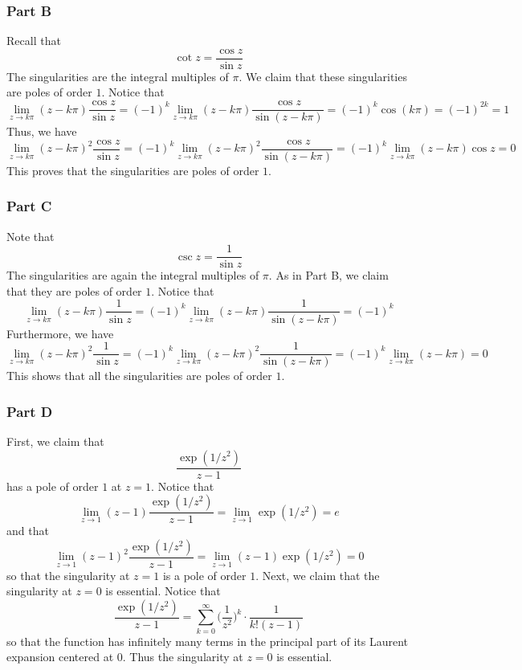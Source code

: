 \documentclass[12pt]{article}
\begin{document}
\subsubsection*{Part B}
Recall that 
\[
\cot z = \frac{\cos z}{\sin z}
\] The singularities are the integral multiples of $\pi$. We claim that these singularities are poles of order $1$. Notice that 
\[
\lim_{z\rightarrow k \pi} (z-k \pi) \frac{\cos z}{\sin z} = (-1)^k \lim_{z\rightarrow k \pi} (z-k \pi) \frac{\cos z}{\sin (z - k \pi)} = (-1)^k \cos(k\pi) = (-1)^{2k} = 1
\] Thus, we have
\[
\lim_{z\rightarrow k \pi} (z-k \pi)^2 \frac{\cos z}{\sin z} = (-1)^k \lim_{z\rightarrow k \pi} (z-k \pi)^2 \frac{\cos z}{\sin (z - k \pi)} = (-1)^k \lim_{z\rightarrow k \pi} (z-k \pi) \cos z = 0
\] This proves that the singularities are poles of order $1$.
\subsubsection*{Part C}
Note that
\[
\csc z = \frac{1}{\sin z}
\] The singularities are again the integral multiples of $\pi$. As in Part B, we claim that they are poles of order $1$. Notice that
\[
\lim_{z\rightarrow k\pi} (z- k\pi) \frac{1}{\sin z} = (-1)^k \lim_{z\rightarrow k \pi} (z-k \pi) \frac{1}{\sin (z - k \pi)} = (-1)^k
\] Furthermore, we have
\[
\lim_{z\rightarrow k\pi} (z- k\pi)^2 \frac{1}{\sin z} = (-1)^k \lim_{z\rightarrow k \pi} (z-k \pi)^2 \frac{1}{\sin (z - k \pi)} = (-1)^k \lim_{z\rightarrow k \pi} (z-k \pi) = 0
\] This shows that all the singularities are poles of order $1$.
\subsubsection*{Part D}
First, we claim that
\[
\frac{\exp(1/z^2)}{z-1}
\] has a pole of order $1$ at $z = 1$. Notice that
\[
\lim_{z\rightarrow 1} (z-1) \frac{\exp(1/z^2)}{z-1} = \lim_{z\rightarrow 1} \exp(1/z^2) = e 
\] and that
\[
\lim_{z\rightarrow 1} (z-1)^2 \frac{\exp(1/z^2)}{z-1} = \lim_{z\rightarrow 1} (z-1) \exp(1/z^2) = 0 
\] so that the singularity at $z = 1$ is a pole of order $1$. Next, we claim that the singularity at $z = 0$ is essential. Notice that
\[
\frac{\exp(1/z^2)}{z-1} = \sum_{k=0}^{\infty} \bigg(\frac{1}{z^2}\bigg)^k \cdot \frac{1}{k!(z-1)}
\] so that the function has infinitely many terms in the principal part of its Laurent expansion centered at $0$. Thus the singularity at $z = 0$ is essential. 
\end{document}
